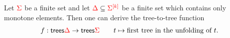 \begin{corollary}\label{cor:matrix-power}
    Let ${\color{red}{\Sigma}}$ be a finite set and let ${\color{red}{\Delta}} \subseteq {\color{red}{\Sigma}}^{{\color{red}{[k]}}}$ be a finite set which contains only monotone elements. Then one can derive the tree-to-tree function
    \begin{align*}
    f : \mathsf {trees} {\color{red}{\Delta}} \to \mathsf {trees} {\color{red}{\Sigma}}  \qquad t \mapsto \text{first tree in the unfolding of $t$.}
    \end{align*}
\end{corollary}

